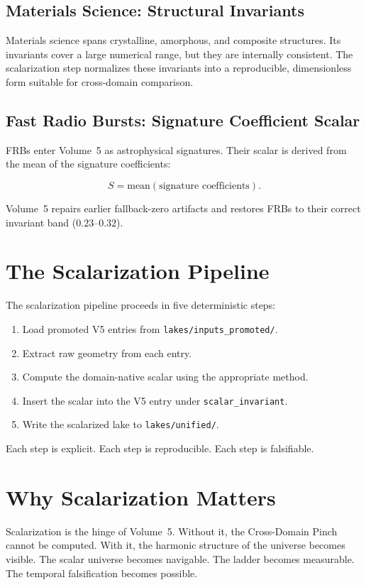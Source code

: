 \documentclass[11pt, letterpaper, openany]{book}
\begin{document}
\subsection*{Materials Science: Structural Invariants}
Materials science spans crystalline, amorphous, and composite structures. Its invariants cover a
large numerical range, but they are internally consistent. The scalarization step normalizes these
invariants into a reproducible, dimensionless form suitable for cross-domain comparison.

\subsection*{Fast Radio Bursts: Signature Coefficient Scalar}
FRBs enter Volume~5 as astrophysical signatures. Their scalar is derived from the mean of the
signature coefficients:



\[
S = \mathrm{mean}(\text{signature coefficients}).
\]



Volume~5 repairs earlier fallback-zero artifacts and restores FRBs to their correct invariant band
($0.23$–$0.32$).

\section*{The Scalarization Pipeline}
The scalarization pipeline proceeds in five deterministic steps:

\begin{enumerate}
    \item Load promoted V5 entries from \texttt{lakes/inputs\_promoted/}.
    \item Extract raw geometry from each entry.
    \item Compute the domain-native scalar using the appropriate method.
    \item Insert the scalar into the V5 entry under \texttt{scalar\_invariant}.
    \item Write the scalarized lake to \texttt{lakes/unified/}.
\end{enumerate}

Each step is explicit.  
Each step is reproducible.  
Each step is falsifiable.

\section*{Why Scalarization Matters}
Scalarization is the hinge of Volume~5. Without it, the Cross-Domain Pinch cannot be computed.
With it, the harmonic structure of the universe becomes visible. The scalar universe becomes
navigable. The ladder becomes measurable. The temporal falsification becomes possible.
\end{document}

